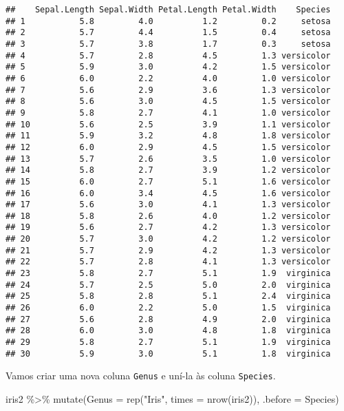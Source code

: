 \documentclass[
]{book}
\newenvironment{Shaded}{\begin{snugshade}}{\end{snugshade}}
\newcommand{\AttributeTok}[1]{\textcolor[rgb]{0.77,0.63,0.00}{#1}}
\newcommand{\FunctionTok}[1]{\textcolor[rgb]{0.00,0.00,0.00}{#1}}
\newcommand{\NormalTok}[1]{#1}
\newcommand{\SpecialCharTok}[1]{\textcolor[rgb]{0.00,0.00,0.00}{#1}}
\newcommand{\StringTok}[1]{\textcolor[rgb]{0.31,0.60,0.02}{#1}}
\begin{document}
\begin{verbatim}
##    Sepal.Length Sepal.Width Petal.Length Petal.Width    Species
## 1           5.8         4.0          1.2         0.2     setosa
## 2           5.7         4.4          1.5         0.4     setosa
## 3           5.7         3.8          1.7         0.3     setosa
## 4           5.7         2.8          4.5         1.3 versicolor
## 5           5.9         3.0          4.2         1.5 versicolor
## 6           6.0         2.2          4.0         1.0 versicolor
## 7           5.6         2.9          3.6         1.3 versicolor
## 8           5.6         3.0          4.5         1.5 versicolor
## 9           5.8         2.7          4.1         1.0 versicolor
## 10          5.6         2.5          3.9         1.1 versicolor
## 11          5.9         3.2          4.8         1.8 versicolor
## 12          6.0         2.9          4.5         1.5 versicolor
## 13          5.7         2.6          3.5         1.0 versicolor
## 14          5.8         2.7          3.9         1.2 versicolor
## 15          6.0         2.7          5.1         1.6 versicolor
## 16          6.0         3.4          4.5         1.6 versicolor
## 17          5.6         3.0          4.1         1.3 versicolor
## 18          5.8         2.6          4.0         1.2 versicolor
## 19          5.6         2.7          4.2         1.3 versicolor
## 20          5.7         3.0          4.2         1.2 versicolor
## 21          5.7         2.9          4.2         1.3 versicolor
## 22          5.7         2.8          4.1         1.3 versicolor
## 23          5.8         2.7          5.1         1.9  virginica
## 24          5.7         2.5          5.0         2.0  virginica
## 25          5.8         2.8          5.1         2.4  virginica
## 26          6.0         2.2          5.0         1.5  virginica
## 27          5.6         2.8          4.9         2.0  virginica
## 28          6.0         3.0          4.8         1.8  virginica
## 29          5.8         2.7          5.1         1.9  virginica
## 30          5.9         3.0          5.1         1.8  virginica
\end{verbatim}

Vamos criar uma nova coluna \texttt{Genus} e uní-la às coluna \texttt{Species}.

\begin{Shaded}
\begin{Highlighting}[]
\NormalTok{iris2 }\SpecialCharTok{\%\textgreater{}\%} 
  \FunctionTok{mutate}\NormalTok{(}\AttributeTok{Genus =} \FunctionTok{rep}\NormalTok{(}\StringTok{"Iris"}\NormalTok{, }\AttributeTok{times =} \FunctionTok{nrow}\NormalTok{(iris2)), }\AttributeTok{.before =}\NormalTok{ Species)}
\end{Highlighting}
\end{Shaded}
\end{document}
